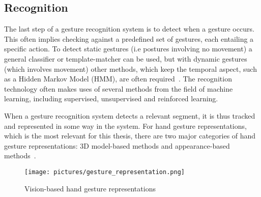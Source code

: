 \subsection{Recognition}
The last step of a gesture recognition system is to detect when a gesture occurs. 
This often implies checking against a predefined set of gestures, each entailing a specific action. 
To detect static gestures (i.e postures involving no movement) a general classifier or template-matcher can be used, 
but with dynamic gestures (which involves movement) other methods, which keep the temporal aspect, such as a Hidden Markov Model (HMM), are often required~\citep{Benton1995}. 
The recognition technology often makes uses of several methods from the field of machine learning, including supervised, unsupervised and reinforced learning.

When a gesture recognition system detects a relevant segment, it is thus tracked and represented in some way in the system. For hand gesture representations, 
which is the most relevant for this thesis, there are two major categories of hand gesture representations: 3D model-based methods and appearance-based methods~\citep{Rautaray2015}.

\begin{figure}%
	\texttt{[image: pictures/gesture\_representation.png]}
	\caption[Vision-based hand gesture representations]{Vision-based hand gesture representations~\citep{Bourke2007} }
	\label{fig:gesture_representations}
\end{figure}


